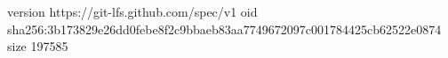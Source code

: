 version https://git-lfs.github.com/spec/v1
oid sha256:3b173829e26dd0febe8f2c9bbaeb83aa7749672097c001784425cb62522e0874
size 197585
